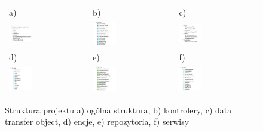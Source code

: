 \begin{figure}[htb]
  \centering
	\begin{tabular}{@{}lll@{}}
	a) & b) & c) \\
  \includegraphics[width=0.3\textwidth]{rys05/ogolne.pdf} & 
	\includegraphics[width=0.3\textwidth]{rys05/controller.pdf} &
	\includegraphics[width=0.3\textwidth]{rys05/dto.pdf} \\

	d) & e) & f) \\
	\includegraphics[width=0.3\textwidth]{rys05/entity.pdf} &
	\includegraphics[width=0.3\textwidth]{rys05/repository.pdf} &
	\includegraphics[width=0.3\textwidth]{rys05/service.pdf}
	\end{tabular}
  \caption{Struktura projektu a) ogólna struktura, b) kontrolery, c) data transfer object, d) encje, e) repozytoria, f) serwisy}
  \label{backend_struktura:label}
\end{figure}

